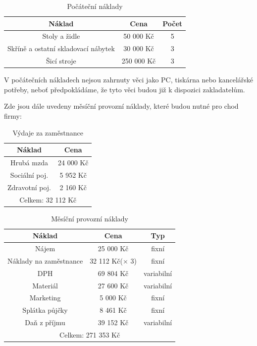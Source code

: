 \documentclass[12pt, a4paper]{article}
\begin{document}
\vspace{30pt}

\begin{table}[h]
  \centering
  \begin{tabular}{ | c | c | c | }
    \hline
    \textbf{Náklad} & \textbf{Cena} & \textbf{Počet} \\
    \hline \hline
    Stoly a židle & 50 000 Kč & 5 \\
    \hline
    Skříně a ostatní skladovací nábytek & 30 000 Kč & 3 \\
    \hline
    Šicí stroje & 250 000 Kč & 3 \\
    \hline
  \end{tabular}
  \caption{Počáteční náklady}
\end{table}

\noindent V počátečních nákladech nejsou zahrnuty věci jako PC, tiskárna nebo kancelářské potřeby, neboť
předpokládáme, že tyto věci budou již k dispozici zakladatelům.

\noindent Zde jsou dále uvedeny měsíční provozní náklady, které budou nutné pro chod firmy:

\begin{table}[h]
  \centering
  \begin{tabular}{ | c | c | }
    \hline
    \textbf{Náklad} & \textbf{Cena} \\
    \hline \hline
    Hrubá mzda & 24 000 Kč \\
    \hline
    Sociální poj. & 5 952 Kč \\
    \hline
    Zdravotní poj. & 2 160 Kč \\
    \hline
    \multicolumn{2}{|c|}{Celkem: 32 112 Kč} \tabularnewline %
    \hline
  \end{tabular}
  \caption{Výdaje za zaměstnance}
\end{table}

\begin{table}[h]
  \centering
  \begin{tabular}{ | c | c | c | }
    \hline
    \textbf{Náklad} & \textbf{Cena} & \textbf{Typ} \\
    \hline \hline
    Nájem & 25 000 Kč & fixní \\
    \hline
    Náklady na zaměstnance & 32 112 Kč($\times$ 3) & fixní \\
    \hline
    DPH & 69 804 Kč & variabilní \\
    \hline
    Materiál & 27 600 Kč & variabilní \\
    \hline
    Marketing & 5 000 Kč & fixní \\
    \hline
    Splátka půjčky & 8 461 Kč & fixní \\
    \hline
    Daň z příjmu & 39 152 Kč & variabilní \\
    \hline
    \multicolumn{3}{|c|}{Celkem: 271 353 Kč} \tabularnewline
    \hline
  \end{tabular}
  \caption{Měsíční provozní náklady}
\end{table}
\end{document}
